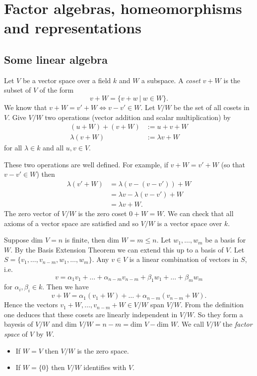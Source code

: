 \section{Factor algebras, homeomorphisms and representations}

\subsection{Some linear algebra}
Let $V$ be a vector space over a field $k$ and $W$ a subspace. A \emph{coset} $v + W$ is the subset of $V$ of the form
\[
  v + W = \{ v + w\ |\ w \in W \}.
\]
We know that $v + W = v' + W \iff v - v' \in W$. Let $V/W$ be the set of all cosets in $V$. Give $V/W$ two operations (vector addition and scalar multiplication) by
\begin{align*}
  (u + W) + (v + W) &:= u + v + W\\
     \lambda(v + W) &:= \lambda v + W
\end{align*}
for all $\lambda \in k$ and all $u, v \in V$.

These two operations are well defined. For example, if $v + W = v' + W$ (so that $v - v' \in W$) then
\begin{align*}
  \lambda(v' + W) &= \lambda(v - (v - v')) + W\\
                  &= \lambda v - \lambda(v - v') + W\\
                  &= \lambda v + W.
\end{align*}
The zero vector of $V/W$ is the zero coset $0 + W = W$. We can check that all axioms of a vector space are satisfied and so $V/W$ is a vector space over $k$.

Suppose $\text{dim } V = n$ is finite, then $\text{dim } W = m \leq n$. Let $w_1, \dots, w_m$ be a basis for $W$. By the Basis Extension Theorem we can extend this up to a basis of $V$. Let $S = \{ v_1, \dots, v_{n-m}, w_1, \dots, w_m \}$. Any $v \in V$ is a linear combination of vectors in $S$, i.e.
\[
  v = \alpha_1 v_1 + \dots + \alpha_{n-m} v_{n-m} + \beta_1 w_1 + \dots + \beta_m w_m
\]
for $\alpha_i, \beta_i \in k$. Then we have
\[
  v + W = \alpha_1 (v_1 + W) + \dots + \alpha_{n-m} (v_{n-m} + W).
\]
Hence the vectors $v_1 + W, \dots, v_{n-m} + W \in V/W$ span $V/W$. From the definition one deduces that these cosets are linearly independent in $V/W$. So they form a bayesis of $V/W$ and $\text{dim } V/W = n - m = \text{dim } V - \text{dim } W$. We call $V/W$ the \emph{factor space} of $V$ by $W$.

\begin{remark}\hfill
  \begin{itemize}
    \item If $W = V$ then $V/W$ is the zero space.
    \item If $W = \{ 0 \}$ then $V/W$ identifies with $V$.
  \end{itemize}
\end{remark}

